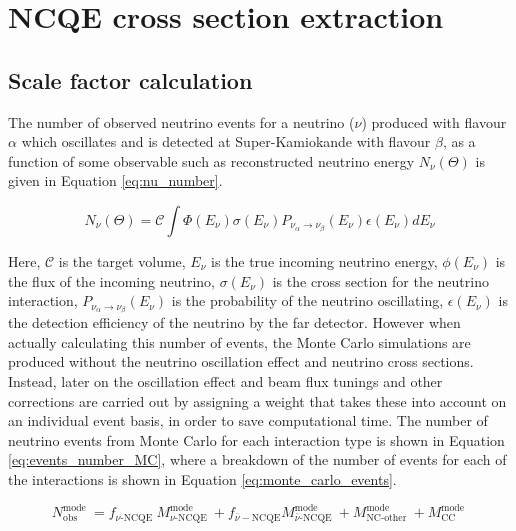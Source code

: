 \chapter{NCQE cross section extraction}
\label{chp:ncqe_xsec}

\section{Scale factor calculation}
The number of observed neutrino events for a neutrino ($\nu$) produced with flavour $\alpha$ which oscillates and is detected at Super-Kamiokande with flavour $\beta$, as a function of some observable such as reconstructed neutrino energy $N_{\nu}(\Theta)$ is given in Equation \ref{eq:nu_number}.

\begin{equation}
    N_\nu(\Theta)=\mathcal{C} \int \Phi\left(E_\nu\right) \sigma\left(E_\nu\right) P_{\nu_\alpha \rightarrow \nu_\beta}\left(E_\nu\right) \epsilon\left(E_\nu\right) d E_\nu
\label{eq:nu_number}
\end{equation}

Here, $\mathcal{C}$ is the target volume, $E_{\nu}$ is the true incoming neutrino energy, $\phi(E_{\nu})$ is the flux of the incoming neutrino, $\sigma(E_{\nu})$ is the cross section for the neutrino interaction, $P_{\nu_\alpha \rightarrow \nu_\beta}(E_{\nu})$ is the probability of the neutrino oscillating, $\epsilon (E_{\nu})$ is the detection efficiency of the neutrino by the far detector. However when actually calculating this number of events, the Monte Carlo simulations are produced without the neutrino oscillation effect and neutrino cross sections. Instead, later on the oscillation effect and beam flux tunings and other corrections are carried out by assigning a weight that takes these into account on an individual event basis, in order to save computational time. The number of neutrino events from Monte Carlo for each interaction type is shown in Equation \ref{eq:events_number_MC}, where a breakdown of the number of events for each of the interactions is shown in Equation \ref{eq:monte_carlo_events}.

\begin{equation}
    N_{\text {obs }}^{\text {mode }} = f_{\nu \text {-NCQE }} M_{\nu \text {-NCQE }}^{\text {mode }}+f_{\bar{\nu}-\mathrm{NCQE}} M_{\bar{\nu} \text {-NCQE }}^{\text {mode }}+M_{\mathrm{NC} \text {-other }}^{\text {mode }}+M_{\mathrm{CC}}^{\text {mode }}
\label{eq:events_number_MC}
\end{equation}

